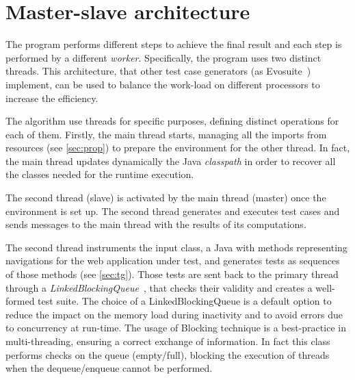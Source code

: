 \section{Master-slave architecture }\label{sec:MSArch}
The program performs different steps to achieve the final result and each step is performed by a different \textit{worker}. Specifically, the program uses two distinct threads. This architecture, that other test case generators (as Evosuite~\cite{evosuite}) implement, can be used to balance the work-load on different processors to increase the efficiency.
 

The algorithm use threads for specific purposes, defining distinct operations for each of them. Firstly, the main thread starts, managing all the imports from resources (see \autoref{sec:prop}) to prepare the environment for the other thread. In fact, the main thread updates dynamically the Java \textit{classpath} in order to recover all the classes needed for the runtime execution.

The second thread (slave) is activated by the main thread (master) once the environment is set up. The second thread generates and executes test cases and sends messages to the main thread with the results of its computations.

The second thread instruments the input class, a Java with methods representing navigations for the web application under test, and generates tests as sequences of those methods (see \autoref{sec:tg}). Those tests are sent back to the primary thread through a \textit{LinkedBlockingQueue}~\cite{linkedBlockingQueue}, that checks their validity and creates a well-formed test suite. The choice of a LinkedBlockingQueue is a default option to reduce the impact on the memory load during inactivity and to avoid errors due to concurrency at run-time.
The usage of Blocking technique is a best-practice in multi-threading, ensuring a correct exchange of information. In fact this class performs checks on the queue (empty/full), blocking the execution of threads when the dequeue/enqueue cannot be performed.